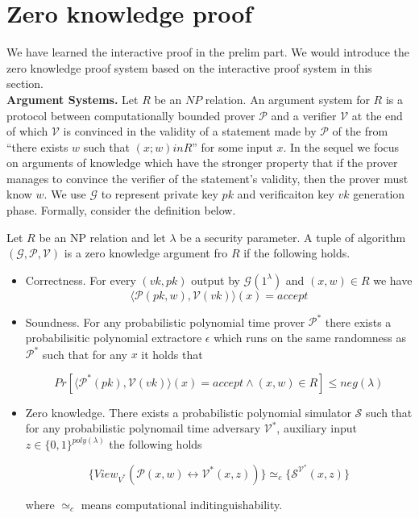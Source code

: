 \section{Zero knowledge proof}

We have learned the interactive proof in the prelim part. We would introduce the zero knowledge proof system based on the interactive proof system in this section.\\

\noindent
\textbf{Argument Systems.} Let $R$ be an $NP$ relation. An argument system for $R$ is a protocol between
computationally bounded prover $\mathcal{P}$ and a verifier $\mathcal{V}$ at the end of which $\mathcal{V}$ is convinced in the validity of a statement made by $\mathcal{P}$ of the from “there exists $w$ such that $(x; w) in R$” for some input $x$. In the sequel we focus on arguments of knowledge which have the stronger property that if the prover manages to convince
the verifier of the statement’s validity, then the prover must know $w$. We use $\mathcal{G}$ to represent private key $pk$ and verificaiton key $vk$ generation phase. Formally, consider the definition below.

\begin{definition}

Let $R$ be an NP relation and let $\lambda$ be a security parameter. A tuple of algorithm $(\mathcal{G}, \mathcal{P}, \mathcal{V})$ is a zero knowledge argument fro $R$ if the following holds.

\begin{itemize}

\item Correctness. For every $(vk, pk)$ output by $\mathcal{G}(1^\lambda)$ and $(x, w) \in R$ we have
$$\langle \mathcal{P}(pk, w), \mathcal{V}(vk) \rangle(x) = accept$$

\item Soundness. For any probabilistic polynomial time prover $\mathcal{P^*}$ there exists a probabilisitic polynomial extractore $\mathcal{\epsilon}$ which runs on the same randomness as $\mathcal{P^*}$ such that for any $x$ it holds that

$$Pr[\langle\mathcal{P^*}(pk), \mathcal{V}(vk) \rangle(x) = accept \wedge (x, w) \in R] \leq neg(\lambda)$$

\item Zero knowledge. There exists a probabilistic polynomial simulator $\mathcal{S}$ such that for any probabilistic polynomail time adversary $\mathcal{V^*}$, auxiliary input $z \in \{0, 1\}^{poly(\lambda)}$ the following holds

$$\{View_{V^*}(\mathcal{P}(x, w) \leftrightarrow \mathcal{V^*}(x, z))\} \simeq_{c} \{\mathcal{S}^{\mathcal{V^*}}(x, z)\}$$

where $\simeq_{c}$ means computational inditinguishability. 

\end{itemize}

\end{definition}
